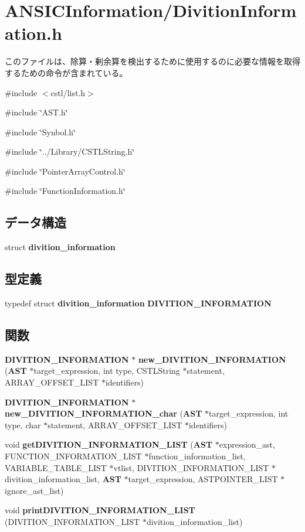 \section{ANSICInformation/DivitionInformation.h}
\label{DivitionInformation_8h}


このファイルは、除算・剰余算を検出するために使用するのに必要な情報を取得するための命令が含まれている。  


{\ttfamily \#include $<$cstl/list.h$>$}\par
{\ttfamily \#include \char`\"{}AST.h\char`\"{}}\par
{\ttfamily \#include \char`\"{}Synbol.h\char`\"{}}\par
{\ttfamily \#include \char`\"{}../Library/CSTLString.h\char`\"{}}\par
{\ttfamily \#include \char`\"{}PointerArrayControl.h\char`\"{}}\par
{\ttfamily \#include \char`\"{}FunctionInformation.h\char`\"{}}\par
\subsection*{データ構造}
\begin{DoxyCompactItemize}
\item 
struct {\bf divition\_\-information}
\end{DoxyCompactItemize}
\subsection*{型定義}
\begin{DoxyCompactItemize}
\item 
typedef struct {\bf divition\_\-information} {\bf DIVITION\_\-INFORMATION}
\end{DoxyCompactItemize}
\subsection*{関数}
\begin{DoxyCompactItemize}
\item 
{\bf DIVITION\_\-INFORMATION} $\ast$ {\bf new\_\-DIVITION\_\-INFORMATION} ({\bf AST} $\ast$target\_\-expression, int type, CSTLString $\ast$statement, ARRAY\_\-OFFSET\_\-LIST $\ast$identifiers)
\item 
{\bf DIVITION\_\-INFORMATION} $\ast$ {\bf new\_\-DIVITION\_\-INFORMATION\_\-char} ({\bf AST} $\ast$target\_\-expression, int type, char $\ast$statement, ARRAY\_\-OFFSET\_\-LIST $\ast$identifiers)
\item 
void {\bf getDIVITION\_\-INFORMATION\_\-LIST} ({\bf AST} $\ast$expression\_\-ast, FUNCTION\_\-INFORMATION\_\-LIST $\ast$function\_\-information\_\-list, VARIABLE\_\-TABLE\_\-LIST $\ast$vtlist, DIVITION\_\-INFORMATION\_\-LIST $\ast$divition\_\-information\_\-list, {\bf AST} $\ast$target\_\-expression, ASTPOINTER\_\-LIST $\ast$ignore\_\-ast\_\-list)
\item 
void {\bf printDIVITION\_\-INFORMATION\_\-LIST} (DIVITION\_\-INFORMATION\_\-LIST $\ast$divition\_\-information\_\-list)
\end{DoxyCompactItemize}


